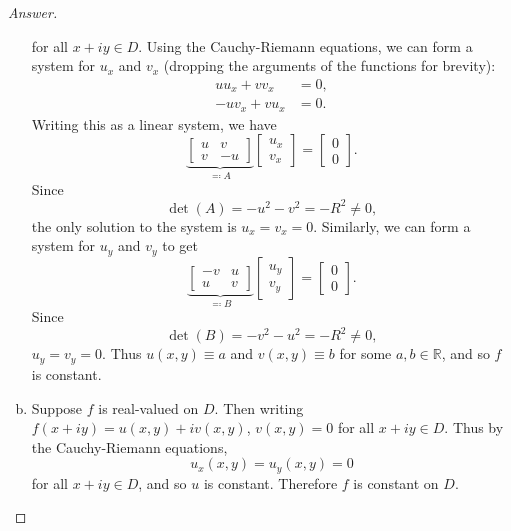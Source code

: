 \documentclass[12pt]{article}
\newcommand{\real}{\mathbb{R}}
\theoremstyle{definition}
\begin{document}
\begin{proof}[Answer]
\begin{enumerate}[(a)]
        for all $x + iy \in D$. Using the Cauchy-Riemann equations, we can form a system for $u_x$ and $v_x$ (dropping the arguments of the functions for brevity):
        \begin{align*}
            u u_x + v v_x & = 0, \\
            -u v_x + v u_x & = 0.
        \end{align*}
        Writing this as a linear system, we have
        \[
            \underbrace{ 
            \begin{bmatrix}
                u & v \\
                v & -u
            \end{bmatrix}
            }_{ \eqqcolon A }
            \begin{bmatrix}
                u_x \\
                v_x
            \end{bmatrix}
            =
            \begin{bmatrix}
                0 \\
                0
            \end{bmatrix}.
        \]
        Since 
        \[
            \det(A) = -u^2 - v^2 = -R^2 \neq 0,
        \]
        the only solution to the system is $u_x = v_x = 0$. Similarly, we can form a system for $u_y$ and $v_y$ to get
        \[
            \underbrace{ 
            \begin{bmatrix}
                -v & u \\
                u & v
            \end{bmatrix}
            }_{ \eqqcolon B }
            \begin{bmatrix}
                u_y \\
                v_y
            \end{bmatrix}
            =
            \begin{bmatrix}
                0 \\
                0
            \end{bmatrix}.
        \]
        Since 
        \[
            \det(B) = -v^2 - u^2 = -R^2 \neq 0,
        \]
        $u_y = v_y = 0$. Thus $u(x,y) \equiv a$ and $v(x,y) \equiv b$ for some $a,b \in \real$, and so $f$ is constant.
        \item Suppose $f$ is real-valued on $D$. Then writing $f(x+iy) = u(x,y) + iv(x,y)$, $v(x,y) = 0$ for all $x + iy \in D$. Thus by the Cauchy-Riemann equations,
        \[
            u_x(x,y) = u_y(x,y) = 0
        \]
        for all $x + iy \in D$, and so $u$ is constant. Therefore $f$ is constant on $D$.
    \end{enumerate}
\end{proof}
\end{document}
